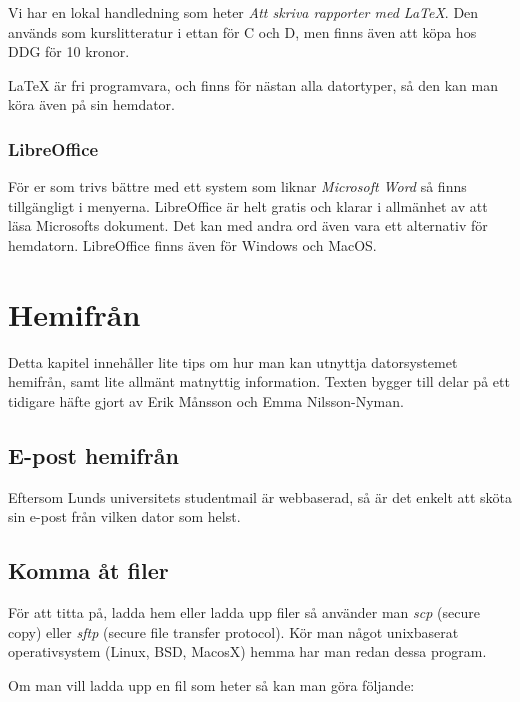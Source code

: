 \documentclass[a4paper,twocolumn]{book}
\begin{document}
Vi har en lokal handledning som heter \emph{Att skriva rapporter med
\LaTeX}. Den används som kurslitteratur i ettan för C och D, men finns även 
att köpa hos DDG för 10 kronor.

\LaTeX{} är fri programvara, och finns för nästan alla datortyper, så
den kan man köra även på sin hemdator.

\subsection{LibreOffice}

För er som trivs bättre med ett system som liknar \emph{Microsoft Word}
så finns  tillgängligt i menyerna. LibreOffice är helt
gratis och klarar i allmänhet av att läsa Microsofts dokument. Det kan med
andra ord även vara ett alternativ för hemdatorn. LibreOffice finns även för
Windows och MacOS.


\chapter{Hemifrån}
\label{cha:hemifran}

Detta kapitel innehåller lite tips om hur man kan utnyttja datorsystemet
hemifrån, samt lite allmänt matnyttig information. Texten bygger till 
delar på ett tidigare häfte gjort av Erik Månsson och Emma Nilsson-Nyman.

\section{E-post hemifrån}

Eftersom Lunds universitets studentmail är webbaserad, så är det enkelt att
sköta sin e-post från vilken dator som helst.


\section{Komma åt filer}

För att titta på, ladda hem eller ladda upp filer så använder man \emph{scp}
(secure copy) eller \emph{sftp} (secure file transfer protocol). Kör man något
unixbaserat operativsystem (Linux, BSD, MacosX) hemma har man redan dessa
program. 

Om man vill ladda upp en fil som heter  så kan man göra följande:
\end{document}
